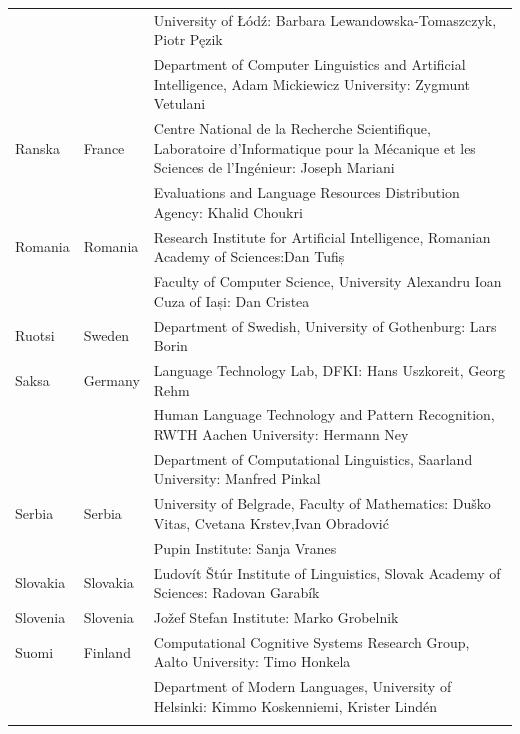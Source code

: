 \begin{longtable}{@{}llp{113mm}@{}}
  & & University of Łódź: Barbara Lewandowska-Tomaszczyk, Piotr Pęzik\\ \addlinespace
  & & Department of Computer Linguistics and Artificial Intelligence, Adam Mickiewicz University: Zygmunt Vetulani \\ \addlinespace
Ranska & \textcolor{grey1}{France} & Centre National de la Recherche Scientifique, Laboratoire d'Informatique pour la Mécanique et les Sciences de l'Ingénieur: Joseph Mariani \\ \addlinespace
  & & Evaluations and Language Resources Distribution Agency: Khalid Choukri\\ \addlinespace 
Romania & \textcolor{grey1}{Romania} & Research Institute for Artificial Intelligence, Romanian Academy of Sciences:\newline Dan Tufiș \\ \addlinespace
  & & Faculty of Computer Science, University Alexandru Ioan Cuza of Iași: Dan Cristea \\ \addlinespace
Ruotsi & \textcolor{grey1}{Sweden} & Department of Swedish, University of Gothenburg: Lars Borin \\ \addlinespace 
Saksa & \textcolor{grey1}{Germany} & Language Technology Lab, DFKI: Hans Uszkoreit, Georg Rehm\\ \addlinespace
  & & Human Language Technology and Pattern Recognition, RWTH Aachen University: Hermann Ney \\ \addlinespace
  & & Department of Computational Linguistics, Saarland University: Manfred Pinkal\\ \addlinespace 
Serbia & \textcolor{grey1}{Serbia} & University of Belgrade, Faculty of Mathematics: Duško Vitas, Cvetana Krstev,\newline Ivan Obradović \\ \addlinespace
  & & Pupin Institute: Sanja Vranes \\ \addlinespace  
Slovakia & \textcolor{grey1}{Slovakia} & Ľudovít Štúr Institute of Linguistics, Slovak Academy of Sciences: Radovan Garabík \\ \addlinespace 
Slovenia & \textcolor{grey1}{Slovenia} & Jožef Stefan Institute: Marko Grobelnik \\ \addlinespace 
Suomi & \textcolor{grey1}{Finland} & Computational Cognitive Systems Research Group, Aalto University: Timo Honkela\\ \addlinespace
& & Department of Modern Languages, University of Helsinki: Kimmo Koskenniemi, Krister Lindén \\ \addlinespace

\end{longtable}
